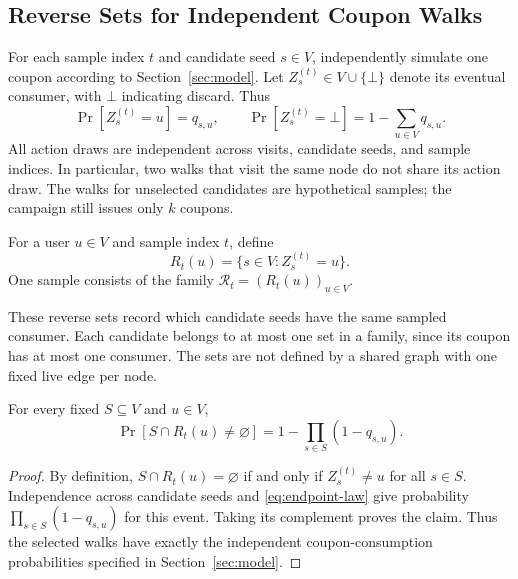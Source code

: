 \documentclass[sigconf]{acmart}
\begin{document}
\subsection{Reverse Sets for Independent Coupon Walks}

For each sample index $t$ and candidate seed $s\in V$, independently
simulate one coupon according to Section~\ref{sec:model}. Let
$Z_s^{(t)}\in V\cup\{\bot\}$ denote its eventual consumer, with
$\bot$ indicating discard. Thus
\begin{equation}
\label{eq:endpoint-law}
  \Pr[Z_s^{(t)}=u]=q_{s,u},\qquad
  \Pr[Z_s^{(t)}=\bot]=1-\sum_{u\in V}q_{s,u}.
\end{equation}
All action draws are independent across visits, candidate seeds, and
sample indices. In particular, two walks that visit the same node do
not share its action draw. The walks for unselected candidates are
hypothetical samples; the campaign still issues only $k$ coupons.

\begin{definition}
For a user $u\in V$ and sample index $t$, define
\[
  R_t(u)=\{s\in V:Z_s^{(t)}=u\}.
\]
One sample consists of the family $\mathcal{R}_t=(R_t(u))_{u\in V}$.
\end{definition}

These reverse sets record which candidate seeds have the same sampled
consumer. Each candidate belongs to at most one set in a family,
since its coupon has at most one consumer. The sets are not defined by
a shared graph with one fixed live edge per node.

\begin{lemma}
\label{lem:coverage}
For every fixed $S\subseteq V$ and $u\in V$,
\begin{equation}
\label{eq:reverse-coverage}
  \Pr[S\cap R_t(u)\ne\varnothing]
    =1-\prod_{s\in S}(1-q_{s,u}).
\end{equation}
\end{lemma}

\begin{proof}
By definition, $S\cap R_t(u)=\varnothing$ if and only if
$Z_s^{(t)}\ne u$ for all $s\in S$. Independence across candidate
seeds and \eqref{eq:endpoint-law} give probability
$\prod_{s\in S}(1-q_{s,u})$ for this event. Taking its complement
proves the claim. Thus the selected walks have exactly the independent
coupon-consumption probabilities specified in Section~\ref{sec:model}.
\end{proof}
\end{document}
